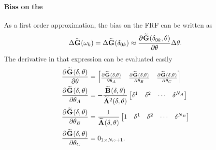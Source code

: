 \paragraph{Bias on the }
As a first order approximation, the bias on the \gls{FRF} can be written as
\begin{equation}
  \Delta \mathbf{\widetilde{G}}_{} (\omega_k) 
  =
  \Delta \mathbf{\widetilde{G}}_{} (\delta_{0k}) 
     \approx 
        \frac{{\partial}^{} \mathbf{\widetilde{G}}_{} (\delta_{0k},\theta)}{\partial \theta} 
      \Delta \theta
      \text{.}
\end{equation}
The derivative in that expression can be evaluated easily
\begin{align}
    \PartialDerivative{\LocalModel{G}(\dW, \theta)}{\theta} 
     &=
     \begin{bmatrix}
       \PartialDerivative{\LocalModel{G}(\dW,\theta)}{\theta_A} &
       \PartialDerivative{\LocalModel{G}(\dW,\theta)}{\theta_B} &
       \PartialDerivative{\LocalModel{G}(\dW,\theta)}{\theta_C} 
     \end{bmatrix}
     \\
     \PartialDerivative{\LocalModel{G}(\dW, \theta)}{\theta_A} 
     &=
     - \frac{\LocalModel{B}(\dW, \theta)}{\LocalModel{A}^2(\dW, \theta)}
     \begin{bmatrix}
         \dW^1 & \dW^2 & \deemph{\cdots} & \dW^{\order{A}}
     \end{bmatrix}
     \\
     \PartialDerivative{\LocalModel{G}(\dW, \theta)}{\theta_B} 
     &=
     \frac{1}{\LocalModel{A}(\dW, \theta)}
     \begin{bmatrix}
         1 & \dW^1 & \dW^2 & \deemph{\cdots} & \dW^{\order{B}}
     \end{bmatrix}
     \\
     \PartialDerivative{\LocalModel{G}(\dW, \theta)}{\theta_C} 
     &=
     \Zero{1 \times \order{C}+1}
     \text{.}
\end{align}

